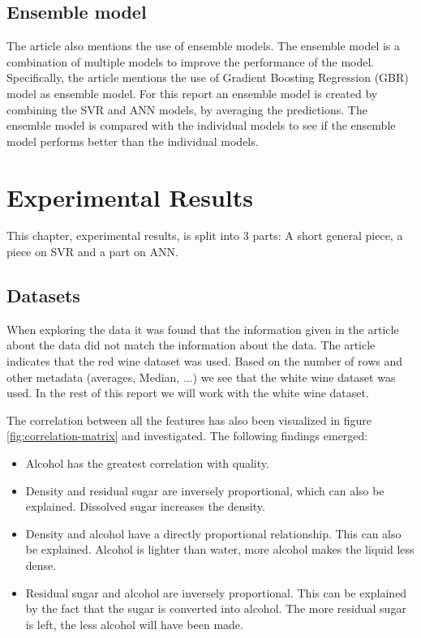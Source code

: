 \documentclass{article}
\begin{document}
\subsection{Ensemble model}
The article \cite{dahal2021prediction} also mentions the use of ensemble models.
The ensemble model is a combination of multiple models to improve the performance of the model.
Specifically, the article mentions the use of Gradient Boosting Regression (GBR) model as ensemble model.
For this report an ensemble model is created by combining the SVR and ANN models, by averaging the predictions.
The ensemble model is compared with the individual models to see if the ensemble model performs better than the individual models.

\section{Experimental Results}
This chapter, experimental results, is split into 3 parts: A short general piece, a piece on SVR and a part on ANN.

\subsection{Datasets}
When exploring the data it was found that the information given in the article about the data did not match the information about the data.
The article indicates that the red wine dataset was used.
Based on the number of rows and other metadata (averages, Median, ...) we see that the white wine dataset was used.
In the rest of this report we will work with the white wine dataset.

The correlation between all the features has also been visualized in figure \autoref{fig:correlation-matrix} and investigated. The following findings emerged:
\begin{itemize}
	\item Alcohol has the greatest correlation with quality.
	\item Density and residual sugar are inversely proportional, which can also be explained. Dissolved sugar increases the density.
	\item Density and alcohol have a directly proportional relationship. This can also be explained. Alcohol is lighter than water, more alcohol makes the liquid less dense.
	\item Residual sugar and alcohol are inversely proportional. This can be explained by the fact that the sugar is converted into alcohol. The more residual sugar is left, the less alcohol will have been made.
\end{itemize}
\end{document}
